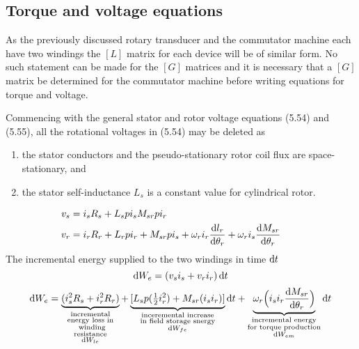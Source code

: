 \documentclass[a4paper,numbers=noenddot,12pt]{scrbook}
\begin{document}
\subsection{Torque and voltage equations}
As the previously discussed rotary transducer and the commutator machine each have two windings the $[L]$ matrix for each device will be of similar form. No such statement can be made for the $[G]$ matrices and it is necessary that a $[G]$ matrix be determined for the commutator machine before writing equations for torque and voltage.

Commencing with the general stator and rotor voltage equations (5.54) and (5.55), all the rotational voltages in (5.54) may be deleted as
\noindent
\begin{enumerate}
    \item the stator conductors and the pseudo-stationary rotor coil flux are space-stationary, and
    \item the stator self-inductance $L_s$ is a constant value for cylindrical rotor.
\end{enumerate} 
\begin{align}
    v_s & = i_s R_s + L_s p i_s  M_{sr} p i_r \\
    v_r & = i_r R_r + L_r p i_r + M_{sr} p i_s + \omega_r i_r \frac{\dif l_r}{\dif \theta_r} + \omega_r i _s \frac{\dif M_{sr}}{\dif \theta_r} &&
\end{align}
The incremental energy supplied to the two windings in time $\dif t$
\begin{equation}
    \dif W_e = (v_s i_s + v_r i_r) \dif t
\end{equation}
\begin{equation}
    \dif W_e = \underbrace{(i_s^2 R_s + i_r^2 R_r)}_
    {\substack{\text{incremental}\\ 
    \text{energy loss in}\\ 
    \text{winding} \\
    \text{resistance} \\ 
    \dif W_{le}}} + 
    \underbrace{[L_s p (\tfrac{1}{2}i_r^2) + M_{sr}(i_s i_r)]}_
    {\substack{\text{inceremental increase}\\
    \text{in field storage snergy}\\
    \dif W_{fe}}}
    \dif t
    + \underbrace{\omega_r \Big( i_s i_r \frac{\dif M_{sr}}{\dif \theta_r} \Big)}_
    {\substack{\text{incremental energy} \\
    \text{for torque production} \\
    \dif W_{em}}}
    \dif t		
\end{equation}
\end{document}
